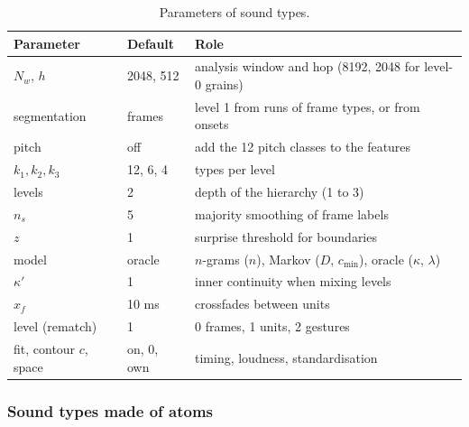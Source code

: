 \documentclass[11pt,a4paper]{article}
\begin{document}
\begin{table}[t]
\centering
\small
\begin{tabular}{lll}
\toprule
Parameter & Default & Role \\
\midrule
$N_w$, $h$ & 2048, 512 & analysis window and hop (8192, 2048 for level-0 grains) \\
segmentation & frames & level 1 from runs of frame types, or from onsets \\
pitch & off & add the 12 pitch classes to the features \\
$k_1, k_2, k_3$ & 12, 6, 4 & types per level \\
levels & 2 & depth of the hierarchy (1 to 3) \\
$n_s$ & 5 & majority smoothing of frame labels \\
$z$ & 1 & surprise threshold for boundaries \\
model & oracle & $n$-grams ($n$), Markov ($D$, $c_{\min}$), oracle ($\kappa$, $\lambda$) \\
$\kappa'$ & 1 & inner continuity when mixing levels \\
$x_f$ & 10 ms & crossfades between units \\
level (rematch) & 1 & 0 frames, 1 units, 2 gestures \\
fit, contour $c$, space & on, 0, own & timing, loudness, standardisation \\
\bottomrule
\end{tabular}
\caption{Parameters of sound types.}
\label{tab:st}
\end{table}

\subsubsection{Sound types made of atoms}
\label{sec:atoms}
\end{document}
